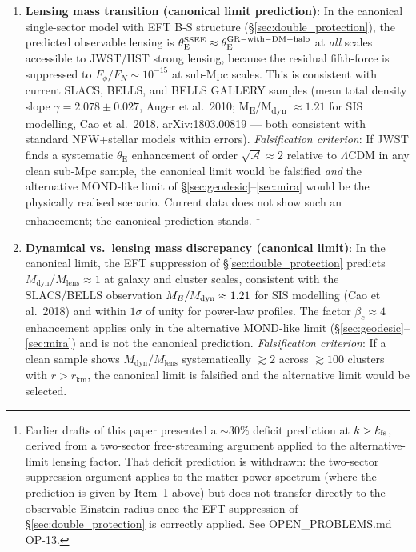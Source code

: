 \documentclass[12pt,a4paper]{article}
\newcommand{\AURA}{\mathcal{A}}
\newcommand{\bc}{\beta_c}
\newcommand{\rV}{r_{\mathrm{km}}}
\newcommand{\thetaE}{\theta_{\mathrm{E}}}
\begin{document}
\begin{enumerate}
  \item \textbf{Lensing mass transition (canonical limit prediction)}:
        In the canonical single-sector model with EFT B-S structure
        (\S\ref{sec:double_protection}), the predicted observable lensing
        is $\thetaE^{\rm SSEE}\approx\thetaE^{\rm GR-with-DM-halo}$ at
        \emph{all} scales accessible to JWST/HST strong lensing, because
        the residual fifth-force is suppressed to $F_\phi/F_N\sim 10^{-15}$
        at sub-Mpc scales. This is consistent with current SLACS, BELLS,
        and BELLS GALLERY samples (mean total density slope
        $\gamma=2.078\pm 0.027$, Auger et al.\ 2010; M\textsubscript{E}/M\textsubscript{dyn}
        $\approx 1.21$ for SIS modelling, Cao et al.\ 2018,
        arXiv:1803.00819 — both consistent with standard NFW+stellar
        models within errors).
        \textit{Falsification criterion}: If JWST finds a systematic
        $\thetaE$ enhancement of order $\sqrt{\AURA}\approx 2$ relative to
        $\Lambda$CDM in any clean sub-Mpc sample, the canonical limit
        would be falsified \emph{and} the alternative MOND-like limit of
        \S\ref{sec:geodesic}--\ref{sec:mira} would be the physically
        realised scenario. Current data does not show such an enhancement;
        the canonical prediction stands.
        \footnote{Earlier drafts of this paper presented a $\sim 30\%$
        deficit prediction at $k>k_{\rm fs}$, derived from a two-sector
        free-streaming argument applied to the alternative-limit lensing
        factor. That deficit prediction is withdrawn: the two-sector
        suppression argument applies to the matter power spectrum (where
        the prediction is given by Item~1 above) but does not transfer
        directly to the observable Einstein radius once the EFT
        suppression of \S\ref{sec:double_protection} is correctly applied.
        See OPEN\_PROBLEMS.md OP-13.}

  \item \textbf{Dynamical vs.\ lensing mass discrepancy (canonical limit)}:
        In the canonical limit, the EFT suppression of
        \S\ref{sec:double_protection} predicts $M_{\mathrm{dyn}}/M_{\mathrm{lens}}
        \approx 1$ at galaxy and cluster scales, consistent with the
        SLACS/BELLS observation $M_E/M_{\rm dyn}\approx 1.21$ for SIS
        modelling (Cao et al.\ 2018) and within $1\sigma$ of unity for
        power-law profiles. The factor $\bc\approx 4$ enhancement applies
        only in the alternative MOND-like limit
        (\S\ref{sec:geodesic}--\ref{sec:mira}) and is not the canonical
        prediction.
        \textit{Falsification criterion}: If a clean sample shows
        $M_{\mathrm{dyn}}/M_{\mathrm{lens}}$ systematically $\gtrsim 2$
        across $\gtrsim 100$ clusters with $r>\rV$, the canonical limit
        is falsified and the alternative limit would be selected.


\end{enumerate}
\end{document}
